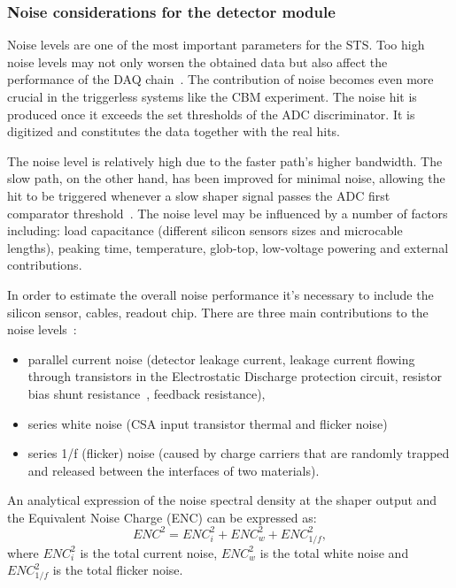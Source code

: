 \subsubsection{Noise considerations for the detector module}
Noise levels are one of the most important parameters for the \gls{STS}. Too high noise levels may not only worsen the obtained data but also affect the performance of the \gls{DAQ} chain~\cite{Heuser:54798}. The contribution of noise becomes even more crucial in the triggerless systems like the \gls{CBM} experiment. The noise hit is produced once it exceeds the set thresholds of the \gls{ADC} discriminator. It is digitized and constitutes the data together with the real hits.

The noise level is relatively high due to the faster path's higher bandwidth. The slow path, on the other hand, has been improved for minimal noise, allowing the hit to be triggered whenever a slow shaper signal passes the ADC first comparator threshold~\cite{RodriguezRodriguez2020}. The noise level may be influenced by a number of factors including: load capacitance 
(different silicon sensors sizes and microcable lengths), peaking time, temperature, glob-top, low-voltage powering and external contributions.

In order to estimate the overall noise performance it's necessary to include the silicon sensor, cables, readout chip. There are three main contributions to the noise levels~\cite{Toia:209729}:
\begin{itemize}
    \item parallel current noise (detector leakage current, leakage current flowing through transistors in the Electrostatic Discharge protection circuit, resistor bias shunt resistance~\cite{Spieler}, feedback resistance),
    \item series white noise (\gls{CSA} input transistor thermal and flicker noise)
    \item series 1/f (flicker) noise (caused by charge carriers that are randomly trapped and released between the interfaces of two materials).
\end{itemize}
An analytical expression of the noise spectral density at the shaper output and the Equivalent Noise Charge (\gls{ENC}) can be expressed as:
\begin{equation}
    ENC^{2} = ENC^{2}_{i} + ENC^{2}_{w} + ENC^{2}_{1/f},
\end{equation}
where $ENC^{2}_{i}$  is the total current noise, $ ENC^{2}_{w}$ is the total white noise and $ENC^{2}_{1/f}$ is the total flicker noise. 

